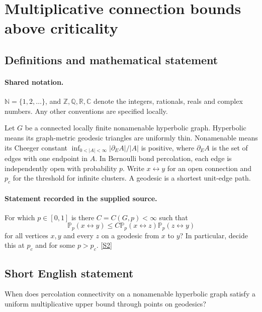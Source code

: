 \documentclass[11pt]{article}
\newcommand{\sref}[2]{\hyperlink{source:#1:#2}{[S#2]}}
\begin{document}
\section{Multiplicative connection bounds above criticality}\label{statement}

\subsection{Definitions and mathematical statement}

\paragraph{Shared notation.}$\mathbb N=\{1,2,\ldots\}$, and $\mathbb Z,\mathbb Q,\mathbb R,\mathbb C$ denote the integers, rationals, reals and complex numbers. Any other conventions are specified locally.


Let $G$ be a connected locally finite nonamenable hyperbolic graph. Hyperbolic means its graph-metric geodesic triangles are uniformly thin. Nonamenable means its Cheeger constant $\inf_{0<|A|<\infty}|\partial_E A|/|A|$ is positive, where $\partial_E A$ is the set of edges with one endpoint in $A$. In Bernoulli bond percolation, each edge is independently open with probability $p$. Write $x\leftrightarrow y$ for an open connection and $p_c$ for the threshold for infinite clusters. A geodesic is a shortest unit-edge path.
\paragraph{Statement recorded in the supplied source.}
For which $p\in[0,1]$ is there $C=C(G,p)<\infty$ such that
\[\mathbb P_p(x\leftrightarrow y)\le C\mathbb P_p(x\leftrightarrow z)\mathbb P_p(z\leftrightarrow y)\]
for all vertices $x,y$ and every $z$ on a geodesic from $x$ to $y$? In particular, decide this at $p_c$ and for some $p>p_c$. \sref{statement}{2}
\subsection{Short English statement}
When does percolation connectivity on a nonamenable hyperbolic graph satisfy a uniform multiplicative upper bound through points on geodesics?
\end{document}
